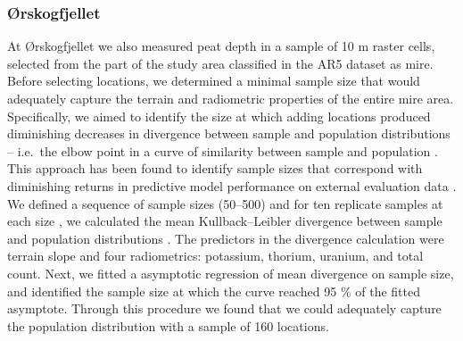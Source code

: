 \documentclass[soil, manuscript]{copernicus}
\begin{document}
\subsubsection{Ørskogfjellet}

At Ørskogfjellet we also measured peat depth in a sample of 10 m raster cells, selected from the part of the study area classified in the AR5 dataset as mire.
Before selecting locations, we determined a minimal sample size that would adequately capture the terrain and radiometric properties of the entire mire area.
Specifically, we aimed to identify the size at which adding locations produced diminishing decreases in divergence between sample and population distributions -- i.e.~the elbow point in a curve of similarity between sample and population \citep{maloneMethodsImproveUtility2019}.
This approach has been found to identify sample sizes that correspond with diminishing returns in predictive model performance on external evaluation data \citep{sauretteDivergenceMetricsDetermining2023}.
We defined a sequence of sample sizes (50--500) and for ten replicate samples at each size \citep[drawn by conditioned latin hypercube sampling,][]{minasnyConditionedLatinHypercube2006, roudierClhsPackageConditioned2011}, we calculated the mean Kullback--Leibler divergence between sample and population distributions \citep{maloneMethodsImproveUtility2019, sauretteDivergenceMetricsDetermining2023}.
The predictors in the divergence calculation were terrain slope and four radiometrics: potassium, thorium, uranium, and total count.
Next, we fitted a asymptotic regression of mean divergence on sample size, and identified the sample size at which the curve reached 95 \% of the fitted asymptote.
Through this procedure we found that we could adequately capture the population distribution with a sample of 160 locations.
\end{document}

